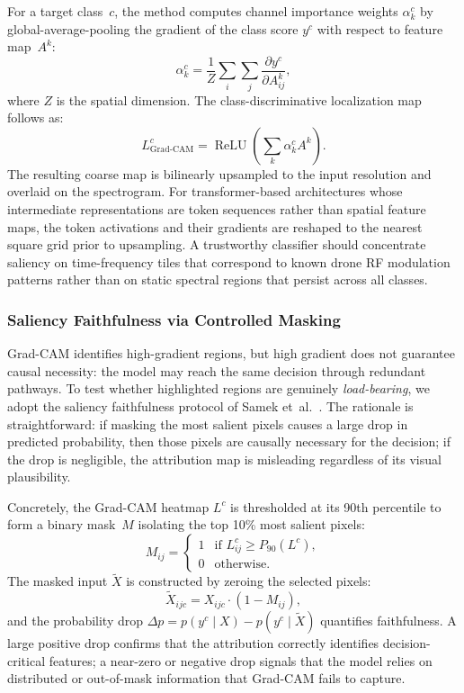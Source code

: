 \documentclass[runningheads]{llncs}
\begin{document}
For a target class~$c$, the method computes channel importance weights $\alpha_k^c$ by global-average-pooling the gradient of the class score $y^c$ with respect to feature map~$A^k$:
\begin{equation}
  \alpha_k^c = \frac{1}{Z} \sum_i \sum_j
               \frac{\partial y^c}{\partial A_{ij}^k},
\end{equation}
where $Z$ is the spatial dimension. The class-discriminative localization map follows as:
\begin{equation}
  L^c_{\text{Grad-CAM}} =
  \operatorname{ReLU}\!\left(\sum_k \alpha_k^c A^k\right).
\end{equation}
The resulting coarse map is bilinearly upsampled to the input resolution and overlaid on the spectrogram. For transformer-based architectures whose intermediate representations are token sequences rather than spatial feature maps, the token activations and their gradients are reshaped to the nearest square grid prior to upsampling. A trustworthy classifier should concentrate saliency on time-frequency tiles that correspond to known drone RF modulation patterns rather than on static spectral regions that persist across all classes.

\subsubsection{Saliency Faithfulness via Controlled Masking}

Grad-CAM identifies high-gradient regions, but high gradient does not guarantee causal necessity: the model may reach the same decision through redundant pathways. To test whether highlighted regions are genuinely \emph{load-bearing}, we adopt the saliency faithfulness protocol of Samek et~al.~\cite{ref32}. The rationale is straightforward: if masking the most salient pixels causes a large drop in predicted probability, then those pixels are causally necessary for the decision; if the drop is negligible, the attribution map is misleading regardless of its visual plausibility.

Concretely, the Grad-CAM heatmap $L^c$ is thresholded at its 90th percentile to form a binary mask~$M$ isolating the top 10\% most salient pixels:
\begin{equation}
  M_{ij} = \begin{cases}
    1 & \text{if } L^c_{ij} \geq P_{90}(L^c), \\
    0 & \text{otherwise}.
  \end{cases}
\end{equation}
The masked input $\tilde{X}$ is constructed by zeroing the selected pixels:
\begin{equation}
  \tilde{X}_{ijc} = X_{ijc} \cdot (1 - M_{ij}),
\end{equation}
and the probability drop $\Delta p = p(y^c \mid X) - p(y^c \mid \tilde{X})$ quantifies faithfulness. A large positive drop confirms that the attribution correctly identifies decision-critical features; a near-zero or negative drop signals that the model relies on distributed or out-of-mask information that Grad-CAM fails to capture.
\end{document}
